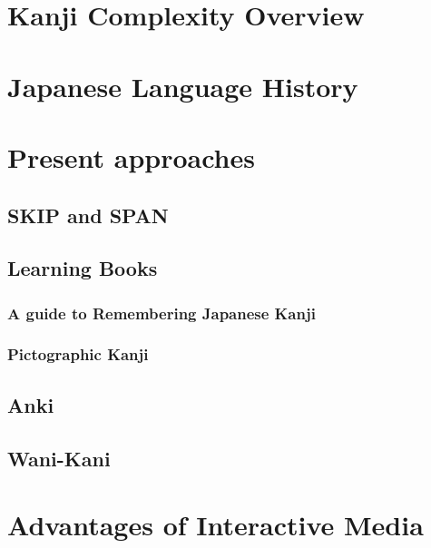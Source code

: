 \section{Kanji Complexity Overview}
\section{Japanese Language History}
\section{Present approaches}
\subsection{SKIP and SPAN}
\subsection{Learning Books}
\subsubsection{A guide to Remembering Japanese Kanji}
\subsubsection{Pictographic Kanji}
\subsection{Anki}
\subsection{Wani-Kani}
\section{Advantages of Interactive Media}
